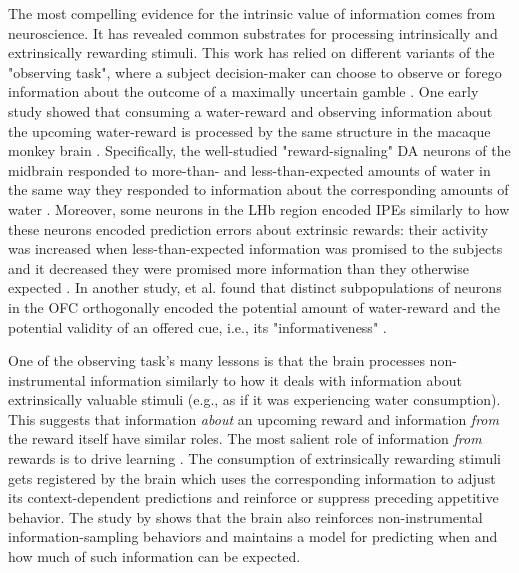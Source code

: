 The most compelling evidence for the intrinsic value of information comes from neuroscience. It has revealed common substrates for processing intrinsically and extrinsically rewarding stimuli. This work has relied on different variants of the "observing task", where a subject decision-maker can choose to observe or forego information about the outcome of a maximally uncertain gamble \parencite[reviewed in][]{kidd_psychology_2015,cervera_systems_2020}. One early study showed that consuming a water-reward and observing information about the upcoming water-reward is processed by the same structure in the macaque monkey brain \parencite{bromberg-martin_midbrain_2009}. Specifically, the well-studied "reward-signaling" \acf{DA} neurons of the midbrain \parencite{schultz_neural_1997} responded to more-than- and less-than-expected amounts of water in the same way they responded to information about the corresponding amounts of water \parencite{bromberg-martin_midbrain_2009}. Moreover, some neurons in the \acf{LHb} region encoded \acp{IPE} similarly to how these neurons encoded prediction errors about extrinsic rewards: their activity was increased when less-than-expected information was promised to the subjects and it decreased they were promised more information than they otherwise expected \parencite{bromberg-martin_lateral_2011}. In another study, \citeauthor{blanchard_orbitofrontal_2015} et al. found that distinct subpopulations of neurons in the \ac{OFC} orthogonally encoded the potential amount of water-reward and the potential validity of an offered cue, i.e., its "informativeness" \parencite{blanchard_orbitofrontal_2015}.

One of the observing task's many lessons is that the brain processes non-instrumental information similarly to how it deals with information about extrinsically valuable stimuli (e.g., as if it was experiencing water consumption). This suggests that information \emph{about} an upcoming reward and information \emph{from} the reward itself have similar roles. The most salient role of information \emph{from} rewards is to drive learning \parencite{schultz_dopamine_2016}. The consumption of extrinsically rewarding stimuli gets registered by the brain which uses the corresponding information to adjust its context-dependent predictions and reinforce or suppress preceding appetitive behavior. The study by \citeauthor{bromberg-martin_midbrain_2009} \citeyearpar{bromberg-martin_midbrain_2009} shows that the brain also reinforces non-instrumental information-sampling behaviors and maintains a model for predicting when and how much of such information can be expected.


